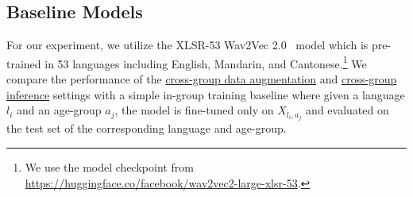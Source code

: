 \documentclass{INTERSPEECH2023}
\newcommand{\ulcolor}[2][]{\setulcolor{#1}\ul{#2}}
\begin{document}
\begin{table}[!t]
    \caption{Evaluation results of \ulcolor[orange]{cross-lingual and cross-age groups inference} on BiMotion. \textbf{Cross-all} denotes cross-age cross-lingual inference. \textbf{eng}, \textbf{zho}, \textbf{eld}, and \textbf{adu} denote English, Mandarin, elderly, and adults, respectively.}
    \label{tab:cgi-result}
    \centering
\end{table}

\subsection{Baseline Models}

For our experiment, we utilize the XLSR-53 Wav2Vec 2.0~\cite{baevski2020wav2vec2,babu2022interspeech} model which is pre-trained in 53 languages including English, Mandarin, and Cantonese.\footnote{We use the model checkpoint from \url{https://huggingface.co/facebook/wav2vec2-large-xlsr-53}.} We compare the performance of the \ulcolor[darkgreen]{cross-group data augmentation} and \ulcolor[orange]{cross-group inference} settings with a simple in-group training baseline where given a language $l_i$ and an age-group $a_j$, the model is fine-tuned only on $X_{l_i, a_j}$ and evaluated on the test set of the corresponding language and age-group.
\end{document}
